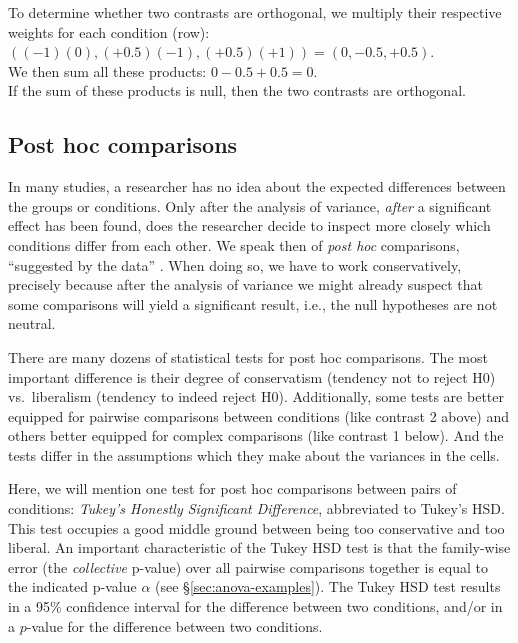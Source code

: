 \documentclass[
]{book}
\begin{document}
To determine whether two contrasts are orthogonal, we multiply
their respective weights for each condition (row):\\
\(( (-1)(0), (+0.5)(-1), (+0.5)(+1) )= (0, -0.5, +0.5)\).\\
We then sum all these products:
\(0 -0.5 + 0.5 = 0\).\\
If the sum of these products is null, then the two
contrasts are orthogonal.

\hypertarget{sec:anova-oneway-posthoc}{%
\subsection{Post hoc comparisons}\label{sec:anova-oneway-posthoc}}

In many studies, a researcher has no idea about the expected differences
between the groups or conditions. Only after the analysis of variance,
\emph{after} a significant effect has been found, does the researcher decide
to inspect more closely which conditions differ from each other. We speak
then of \emph{post hoc} comparisons, ``suggested by the data'' \citep[ p.200]{MD04}.
When doing so, we have to work conservatively, precisely because
after the analysis of variance we might already suspect that some
comparisons will yield a significant result,
i.e., the null hypotheses are not neutral.

There are many dozens of statistical tests for post hoc
comparisons. The most important difference is their degree of conservatism
(tendency not to reject H0) vs.~liberalism (tendency to indeed reject H0).
Additionally, some tests are better equipped
for pairwise comparisons between conditions (like contrast 2 above) and
others better equipped for complex comparisons
(like contrast 1 below). And the tests differ in the assumptions
which they make about the variances in the cells.

Here, we will mention one test
for post hoc comparisons between pairs of conditions: \emph{Tukey's
Honestly Significant Difference}, abbreviated to Tukey's HSD. This test
occupies a good middle ground between being too conservative and too liberal. An
important characteristic of the Tukey HSD test is that the family-wise
error (the \emph{collective} p-value) over all pairwise comparisons together
is equal to the indicated p-value
\(\alpha\) (see §\ref{sec:anova-examples}). The Tukey HSD test results in
a 95\% confidence interval for the difference between two conditions,
and/or in a \(p\)-value for the difference between two conditions.
\end{document}
